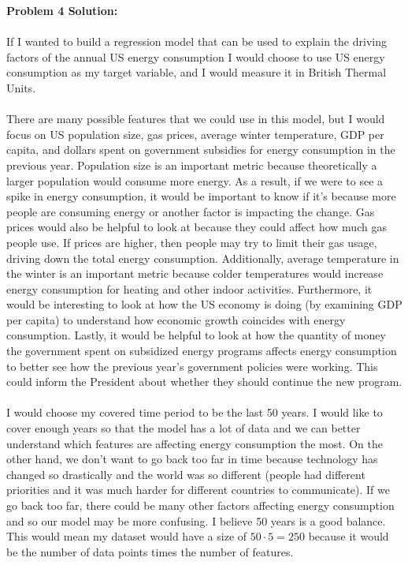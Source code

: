 \documentclass[submit]{harvardml}
\begin{document}
\textbf{Problem 4 Solution:}\\
\\
If I wanted to build a regression model that can be used to explain the driving factors of the annual US energy consumption I would choose to use US energy consumption as my target variable, and I would measure it in British Thermal Units. \\
\\
There are many possible features that we could use in this model, but I would focus on US population size, gas prices, average winter temperature, GDP per capita, and dollars spent on government subsidies for energy consumption in the previous year. Population size is an important metric because theoretically a larger population would consume more energy. As a result, if we were to see a spike in energy consumption, it would be important to know if it's because more people are consuming energy or another factor is impacting the change. Gas prices would also be helpful to look at because they could affect how much gas people use. If prices are higher, then people may try to limit their gas usage, driving down the total energy consumption. Additionally, average temperature in the winter is an important metric because colder temperatures would increase energy consumption for heating and other indoor activities. Furthermore, it would be interesting to look at how the US economy is doing (by examining GDP per capita) to understand how economic growth coincides with energy consumption. Lastly, it would be helpful to look at how the quantity of money the government spent on subsidized energy programs affects energy consumption to better see how the previous year's government policies were working. This could inform the President about whether they should continue the new program.\\
\\
I would choose my covered time period to be the last 50 years. I would like to cover enough years so that the model has a lot of data and we can better understand which features are affecting energy consumption the most. On the other hand, we don't want to go back too far in time because technology has changed so drastically and the world was so different (people had different priorities and it was much harder for different countries to communicate). If we go back too far, there could be many other factors affecting energy consumption and so our model may be more confusing. I believe 50 years is a good balance. This would mean my dataset would have a size of $50\cdot5 = 250$ because it would be the number of data points times the number of features.\\
\end{document}
